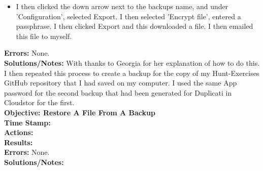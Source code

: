 \documentclass{article}
\begin{document}
\begin{FlushLeft}
\begin{itemize}
    \item I then clicked the down arrow next to the backups name, and under 'Configuration', selected Export. I then selected 'Encrypt file', entered a passphrase. I then clicked Export and this downloaded a file. I then emailed this file to myself.
\end{itemize}
\textbf{Errors:} None.\\
\textbf{Solutions/Notes:} With thanks to Georgia for her explanation of how to do this. I then repeated this process to create a backup for the copy of my Hunt-Exercises GitHub repository that I had saved on my computer. I used the same App password for the second backup that had been generated for Duplicati in Cloudstor for the first.\\
\vspace{5mm}
\textbf{Objective: Restore A File From A Backup}\\
\textbf{Time Stamp:}\\
\textbf{Actions:} \\
\textbf{Results:} \\
\textbf{Errors:} None.\\
\textbf{Solutions/Notes:}\\

\pagebreak


\end{FlushLeft}
\end{document}
